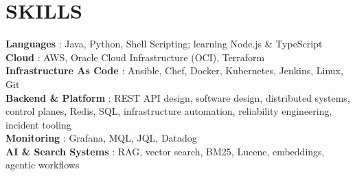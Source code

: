 \documentclass[letterpaper,11pt]{article}
\begin{document}
\section{SKILLS}
\begin{itemize}[leftmargin=0in, label={}]
    \small{\item{
     \textbf{Languages} {: Java, Python, Shell Scripting; learning Node.js \& TypeScript} \\
     \textbf{Cloud} {: AWS, Oracle Cloud Infrastructure (OCI), Terraform} \\
     \textbf{Infrastructure As Code} {: Ansible, Chef, Docker, Kubernetes, Jenkins, Linux, Git} \\
     \textbf{Backend \& Platform} {: REST API design, software design, distributed systems, control planes, Redis, SQL, infrastructure automation, reliability engineering, incident tooling} \\
     \textbf{Monitoring} {: Grafana, MQL, JQL, Datadog} \\
     \textbf{AI \& Search Systems} {: RAG, vector search, BM25, Lucene, embeddings, agentic workflows}
    }}
\end{itemize}

\end{document}
